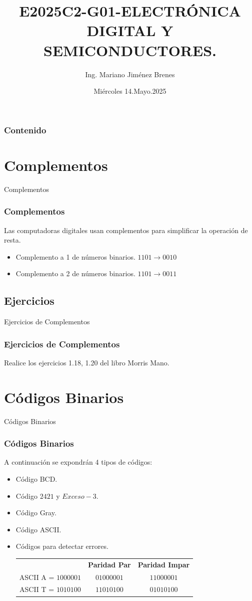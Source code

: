 \documentclass[11pt]{beamer}
\author{Ing. Mariano Jim\'enez Brenes}
\title
{
E2025C2-G01-ELECTRÓNICA DIGITAL Y SEMICONDUCTORES.
}
\institute{
Universidad Castro Carazo\linebreak
T\'ecnico En Semiconductores
}
\date{Mi\'ercoles 14.Mayo.2025}
\begin{document}
\begin{frame}
\maketitle 
\end{frame}

\logo{}

\begin{frame}
\frametitle{Contenido}
\tableofcontents
\end{frame}

\section{Complementos}
\begin{frame}{Complementos}
\frametitle{Complementos}
Las computadoras digitales usan complementos para simplificar la operaci\'on de resta.\linebreak
	\begin{itemize}
		\item Complemento a 1 de n\'umeros binarios.\linebreak
		$1101 \rightarrow 0010$
		\item Complemento a 2 de n\'umeros binarios.\linebreak
		$1101 \rightarrow 0011$
	\end{itemize}
\end{frame}
\subsection{Ejercicios}
\begin{frame}{Ejercicios de Complementos}
	\frametitle{Ejercicios de Complementos}
Realice los ejercicios 1.18, 1.20 del libro Morris Mano.
	\end{frame}

\section{C\'odigos Binarios}
\begin{frame}{C\'odigos Binarios}
\frametitle{C\'odigos Binarios}
A continuaci\'on se expondr\'an 4 tipos de c\'odigos:
	\begin{itemize}
		\item C\'odigo BCD.
		\item C\'odigo $2421$ y $Exceso-3$.
		\item C\'odigo Gray.
		\item C\'odigo ASCII.
		\item C\'odigos para detectar errores.\linebreak
		
		\begin{tabular}{ c c c }
		  					& \textbf{Paridad Par} & \textbf{Paridad Impar} \\ 
		 ASCII A = $1000001$ & $01000001$ & $11000001$ \\  
		 ASCII T = $1010100$ & $11010100$ & $01010100$    
		\end{tabular}
		
	\end{itemize}
\end{frame}
\end{document}
